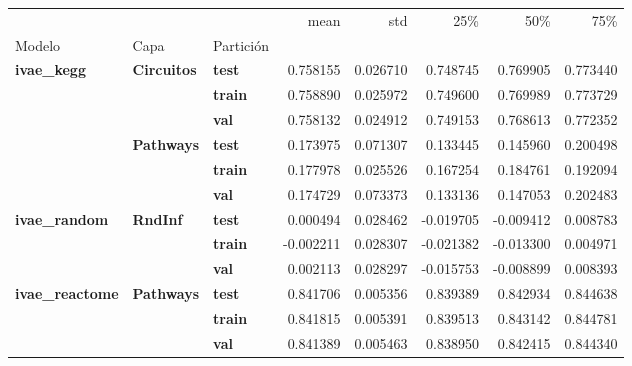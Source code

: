\begin{tabular}{lllrrrrr}
\toprule
 &  &  & mean & std & 25\% & 50\% & 75\% \\
Modelo & Capa & Partición &  &  &  &  &  \\
\midrule
\multirow[t]{6}{*}{\textbf{ivae\_kegg}} & \multirow[t]{3}{*}{\textbf{Circuitos}} & \textbf{test} & 0.758155 & 0.026710 & 0.748745 & 0.769905 & 0.773440 \\
\textbf{} & \textbf{} & \textbf{train} & 0.758890 & 0.025972 & 0.749600 & 0.769989 & 0.773729 \\
\textbf{} & \textbf{} & \textbf{val} & 0.758132 & 0.024912 & 0.749153 & 0.768613 & 0.772352 \\
\cline{2-8}
\textbf{} & \multirow[t]{3}{*}{\textbf{Pathways}} & \textbf{test} & 0.173975 & 0.071307 & 0.133445 & 0.145960 & 0.200498 \\
\textbf{} & \textbf{} & \textbf{train} & 0.177978 & 0.025526 & 0.167254 & 0.184761 & 0.192094 \\
\textbf{} & \textbf{} & \textbf{val} & 0.174729 & 0.073373 & 0.133136 & 0.147053 & 0.202483 \\
\cline{1-8} \cline{2-8}
\multirow[t]{3}{*}{\textbf{ivae\_random}} & \multirow[t]{3}{*}{\textbf{RndInf}} & \textbf{test} & 0.000494 & 0.028462 & -0.019705 & -0.009412 & 0.008783 \\
\textbf{} & \textbf{} & \textbf{train} & -0.002211 & 0.028307 & -0.021382 & -0.013300 & 0.004971 \\
\textbf{} & \textbf{} & \textbf{val} & 0.002113 & 0.028297 & -0.015753 & -0.008899 & 0.008393 \\
\cline{1-8} \cline{2-8}
\multirow[t]{3}{*}{\textbf{ivae\_reactome}} & \multirow[t]{3}{*}{\textbf{Pathways}} & \textbf{test} & 0.841706 & 0.005356 & 0.839389 & 0.842934 & 0.844638 \\
\textbf{} & \textbf{} & \textbf{train} & 0.841815 & 0.005391 & 0.839513 & 0.843142 & 0.844781 \\
\textbf{} & \textbf{} & \textbf{val} & 0.841389 & 0.005463 & 0.838950 & 0.842415 & 0.844340 \\
\cline{1-8} \cline{2-8}
\bottomrule
\end{tabular}
